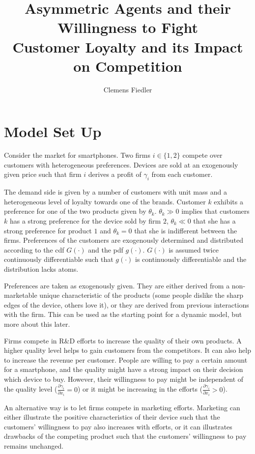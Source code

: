 \documentclass[a4paper, 11pt]{article}
\author{Clemens Fiedler}
\title{Asymmetric Agents and their Willingness to Fight\\
	{\Large Customer Loyalty and its Impact on Competition}}
\begin{document}
	
\maketitle

\section{Model Set Up}
Consider the market for smartphones. Two firms $i\in\{1,2\}$ compete over customers with heterogeneous preferences. Devices are sold at an exogenously given price such that firm $i$ derives a profit of $\gamma_i$ from each customer.
 
The demand side is given by a number of customers with unit mass and a heterogeneous level of loyalty towards one of the brands. Customer $k$ exhibits a preference for one of the two products given by $\theta_k$. $\theta_k\gg0$ implies that customers $k$ has a strong preference for the device sold by firm $2$, $\theta_k\ll0$ that she has a strong preference for product $1$ and $\theta_k= 0$ that she is indifferent between the firms. Preferences of the customers are exogenously determined and distributed according to the cdf $G(\cdot)$ and the pdf $g(\cdot)$. $G(\cdot)$ is assumed twice continuously differentiable such that $g(\cdot)$ is continuously differentiable and the distribution lacks atoms. 

Preferences are taken as exogenously given. They are either derived from a non-marketable unique characteristic of the products (some people dislike the sharp edges of the device, others love it), or they are derived from previous interactions with the firm. This can be used as the starting point for a dynamic model, but more about this later.

Firms compete in R\&D efforts to increase the quality of their own products. A higher quality level helps to gain customers from the competitors. It can also help to increase the revenue per customer. People are willing to pay a certain amount for a smartphone, and the quality might have a strong impact on their decision which device to buy. However, their willingness to pay might be independent of the quality level ($\frac{\partial \gamma_i}{\partial x_i}=0$) or it might be increasing in the efforts ($\frac{\partial \gamma_i}{\partial x_i}>0$).

An alternative way is to let firms compete in marketing efforts. Marketing can either illustrate the positive characteristics of their device such that the customers' willingness to pay also increases with efforts, or it can illustrates drawbacks of the competing product such that the customers' willingness to pay remains unchanged.
\end{document}
